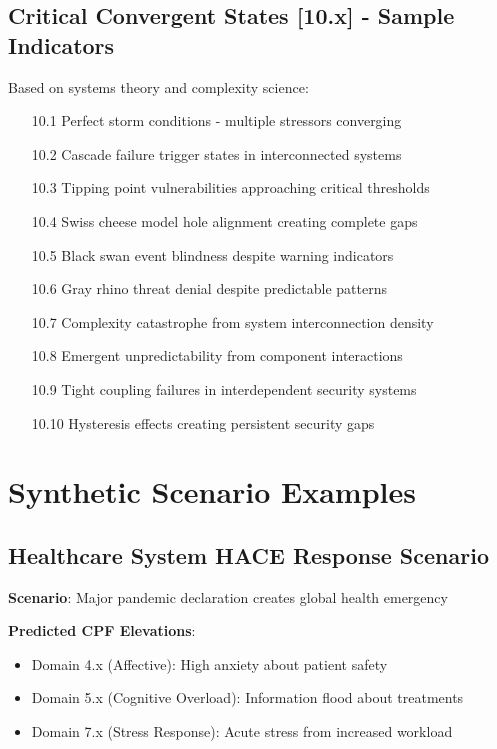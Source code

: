 \documentclass[11pt,a4paper]{article}
\begin{document}
\subsection{Critical Convergent States [10.x] - Sample Indicators}

Based on systems theory and complexity science:

\begin{enumerate}
\item[10.1] Perfect storm conditions - multiple stressors converging
\item[10.2] Cascade failure trigger states in interconnected systems
\item[10.3] Tipping point vulnerabilities approaching critical thresholds
\item[10.4] Swiss cheese model hole alignment creating complete gaps
\item[10.5] Black swan event blindness despite warning indicators
\item[10.6] Gray rhino threat denial despite predictable patterns
\item[10.7] Complexity catastrophe from system interconnection density
\item[10.8] Emergent unpredictability from component interactions
\item[10.9] Tight coupling failures in interdependent security systems
\item[10.10] Hysteresis effects creating persistent security gaps
\end{enumerate}

\section{Synthetic Scenario Examples}

\subsection{Healthcare System HACE Response Scenario}

\textbf{Scenario}: Major pandemic declaration creates global health emergency

\textbf{Predicted CPF Elevations}:
\begin{itemize}
\item Domain 4.x (Affective): High anxiety about patient safety
\item Domain 5.x (Cognitive Overload): Information flood about treatments
\item Domain 7.x (Stress Response): Acute stress from increased workload
\end{itemize}
\end{document}
